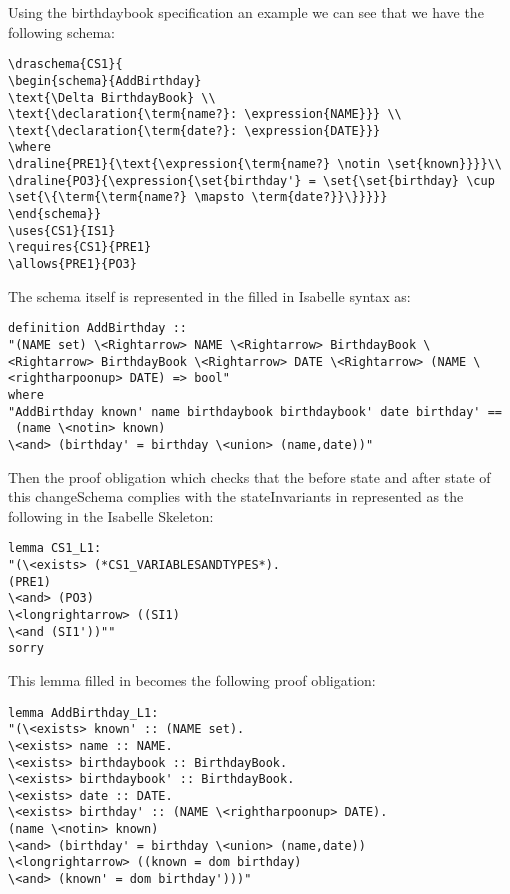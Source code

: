 Using the birthdaybook specification an example we can see that we have the following schema:

\begin{verbatim}
\draschema{CS1}{
\begin{schema}{AddBirthday}
\text{\Delta BirthdayBook} \\
\text{\declaration{\term{name?}: \expression{NAME}}} \\
\text{\declaration{\term{date?}: \expression{DATE}}}
\where
\draline{PRE1}{\text{\expression{\term{name?} \notin \set{known}}}}\\
\draline{PO3}{\expression{\set{birthday'} = \set{\set{birthday} \cup \set{\{\term{\term{name?} \mapsto \term{date?}}\}}}}}
\end{schema}}
\uses{CS1}{IS1}
\requires{CS1}{PRE1}
\allows{PRE1}{PO3}
\end{verbatim}

The schema itself is represented in the filled in Isabelle syntax as:

\begin{verbatim}
definition AddBirthday :: 
"(NAME set) \<Rightarrow> NAME \<Rightarrow> BirthdayBook \<Rightarrow> BirthdayBook \<Rightarrow> DATE \<Rightarrow> (NAME \<rightharpoonup> DATE) => bool"
where 
"AddBirthday known' name birthdaybook birthdaybook' date birthday' ==
 (name \<notin> known)
\<and> (birthday' = birthday \<union> (name,date))"
\end{verbatim}

Then the proof obligation which checks that the before state and after state of this changeSchema complies with the stateInvariants in represented as the following in the Isabelle Skeleton:

\begin{verbatim}
lemma CS1_L1:
"(\<exists> (*CS1_VARIABLESANDTYPES*).
(PRE1)
\<and> (PO3)
\<longrightarrow> ((SI1)
\<and (SI1'))""
sorry
\end{verbatim}

This lemma filled in becomes the following proof obligation:

\begin{verbatim}
lemma AddBirthday_L1:
"(\<exists> known' :: (NAME set).
\<exists> name :: NAME.
\<exists> birthdaybook :: BirthdayBook.
\<exists> birthdaybook' :: BirthdayBook.
\<exists> date :: DATE.
\<exists> birthday' :: (NAME \<rightharpoonup> DATE).
(name \<notin> known)
\<and> (birthday' = birthday \<union> (name,date))
\<longrightarrow> ((known = dom birthday)
\<and> (known' = dom birthday')))"
\end{verbatim}

